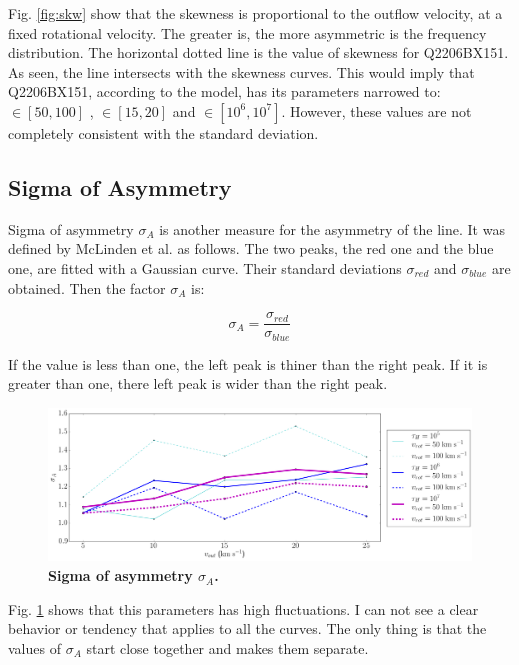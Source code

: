 Fig. \ref{fig:skw} show that the skewness is proportional to the outflow velocity, at a fixed rotational velocity. The greater \vout is, the more asymmetric is the \lya frequency distribution. The horizontal dotted line is the value of skewness for Q2206BX151. As seen, the line intersects with the skewness curves. This would imply that Q2206BX151, according to the model, has its parameters narrowed to: \vrot $\in [50,100]$ \kms, \vout $\in [15,20]$ \kms and \tauh $\in [10^6, 10^7]$. However, these values are not completely consistent with the standard deviation.\\

\subsection{Sigma of Asymmetry}
Sigma of asymmetry $\sigma_A$ is another measure for the asymmetry of the \lya line. It was defined by McLinden et al. \cite{McLinden2011} as follows. The two peaks, the red one and the blue one, are fitted with a Gaussian curve. Their standard deviations $\sigma_{red}$ and $\sigma_{blue}$ are obtained. Then the factor $\sigma_A$ is:

\begin{equation}
\sigma_A = \frac{\sigma_{red}}{\sigma_{blue}}
\end{equation}

If the value is less than one, the left peak is thiner than the right peak. If it is greater than one, there left peak is wider than the right peak.\\

\begin{figure}[h!]
	\begin{center}
		\includegraphics[width=1\textwidth]{./figures/chapter3/sigma}
	\end{center}
	\caption{\textbf{Sigma of asymmetry $\sigma_A$.} 
		\label{fig:sigma}}
\end{figure}

Fig. \ref{fig:sigma} shows that this parameters has high fluctuations. I can not see a clear behavior or tendency that applies to all the curves. The only thing is that the values of $\sigma_A$ start close together and \vout makes them separate.\\ 

